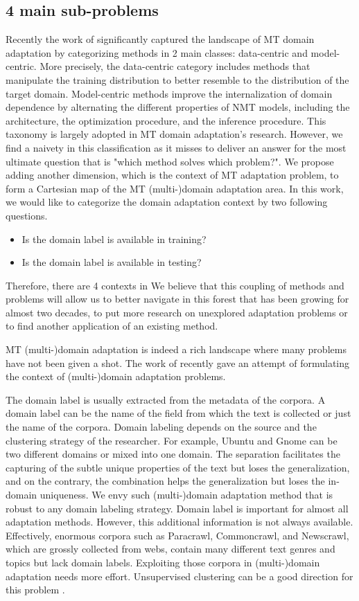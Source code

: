 \subsection{4 main sub-problems}
Recently the work of \citet{Chu18survey} significantly captured the landscape of MT domain adaptation by categorizing methods in 2 main classes: data-centric and model-centric. More precisely, the data-centric category includes methods that manipulate the training distribution to better resemble to the distribution of the target domain. Model-centric methods improve the internalization of domain dependence by alternating the different properties of NMT models, including the architecture, the optimization procedure, and the inference procedure. This taxonomy is largely adopted in MT domain adaptation's research. However, we find a naivety in this classification as it misses to deliver an answer for the most ultimate question that is "which method solves which problem?". We propose adding another dimension, which is the context of MT adaptation problem, to form a Cartesian map of the MT (multi-)domain adaptation area. In this work, we would like to categorize the domain adaptation context by two following questions.
\begin{itemize}
	\item Is the domain label is available in training?
	\item Is the domain label is available in testing?
\end{itemize}
Therefore, there are 4 contexts in 
We believe that this coupling of methods and problems will allow us to better navigate in this forest that has been growing for almost two decades, to put more research on unexplored adaptation problems or to find another application of an existing method.

MT (multi-)domain adaptation is indeed a rich landscape where many problems have not been given a shot. The work of \citet{Pham21revisiting} recently gave an attempt of formulating the context of (multi-)domain adaptation problems.

The domain label is usually extracted from the metadata of the corpora. A domain label can be the name of the field from which the text is collected or just the name of the corpora. Domain labeling depends on the source and the clustering strategy of the researcher. For example, Ubuntu and Gnome can be two different domains or mixed into one domain. The separation facilitates the capturing of the subtle unique properties of the text but loses the generalization, and on the contrary, the combination helps the generalization but loses the in-domain uniqueness. We envy such (multi-)domain adaptation method that is robust to any domain labeling strategy. Domain label is important for almost all adaptation methods. However, this additional information is not always available. Effectively, enormous corpora such as Paracrawl, Commoncrawl, and Newscrawl, which are grossly collected from webs, contain many different text genres and topics but lack domain labels. Exploiting those corpora in (multi-)domain adaptation needs more effort. Unsupervised clustering can be a good direction for this problem \citep{Aharoni20unsupervised,Pham21revisiting}.

